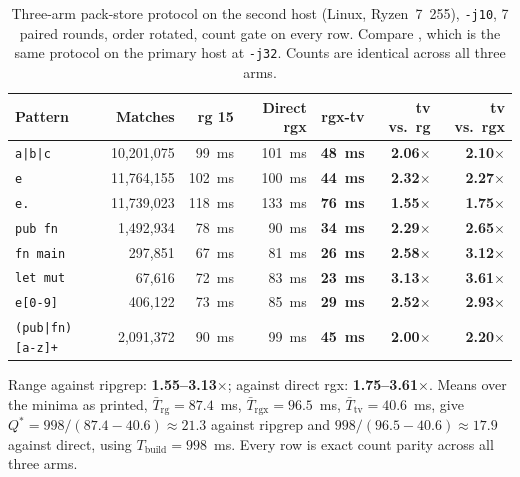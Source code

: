 \documentclass[11pt,letterpaper]{article}
\begin{document}
\begin{table}[htbp]
\centering
\footnotesize
\caption{Three-arm pack-store protocol on the second host (Linux,
Ryzen~7~255), \texttt{-j10}, 7 paired rounds, order rotated, count gate on
every row. Compare , which is the same protocol on the
primary host at \texttt{-j32}. Counts are identical across all three arms.}
\label{tab:linux}
\begin{tabular}{@{}lrrrrrr@{}}
\toprule
\textbf{Pattern} & \textbf{Matches} & \textbf{rg 15} & \textbf{Direct rgx}
  & \textbf{rgx-tv} & \textbf{tv vs.\ rg} & \textbf{tv vs.\ rgx} \\
\midrule
\texttt{a|b|c}      & 10{,}201{,}075 &  99~ms & 101~ms & \textbf{48~ms} & \textbf{2.06$\times$} & \textbf{2.10$\times$} \\
\texttt{e}          & 11{,}764{,}155 & 102~ms & 100~ms & \textbf{44~ms} & \textbf{2.32$\times$} & \textbf{2.27$\times$} \\
\texttt{e.}         & 11{,}739{,}023 & 118~ms & 133~ms & \textbf{76~ms} & \textbf{1.55$\times$} & \textbf{1.75$\times$} \\
\texttt{pub fn}     &  1{,}492{,}934 &  78~ms &  90~ms & \textbf{34~ms} & \textbf{2.29$\times$} & \textbf{2.65$\times$} \\
\texttt{fn main}    &    297{,}851 &  67~ms &  81~ms & \textbf{26~ms} & \textbf{2.58$\times$} & \textbf{3.12$\times$} \\
\texttt{let mut}    &     67{,}616 &  72~ms &  83~ms & \textbf{23~ms} & \textbf{3.13$\times$} & \textbf{3.61$\times$} \\
\texttt{e[0-9]}     &    406{,}122 &  73~ms &  85~ms & \textbf{29~ms} & \textbf{2.52$\times$} & \textbf{2.93$\times$} \\
\texttt{(pub|fn) [a-z]+} &  2{,}091{,}372 &  90~ms &  99~ms & \textbf{45~ms} & \textbf{2.00$\times$} & \textbf{2.20$\times$} \\
\bottomrule
\end{tabular}
\end{table}

Range against ripgrep: \textbf{1.55--3.13$\times$}; against direct rgx:
\textbf{1.75--3.61$\times$}. Means over the minima as printed,
$\bar{T}_{\text{rg}} = 87.4$~ms, $\bar{T}_{\text{rgx}} = 96.5$~ms,
$\bar{T}_{\text{tv}} = 40.6$~ms, give $Q^{*} = 998/(87.4-40.6) \approx 21.3$
against ripgrep and $998/(96.5-40.6) \approx 17.9$ against direct, using
$T_{\text{build}} = 998$~ms.
Every row is exact count parity across all three arms.
\end{document}
